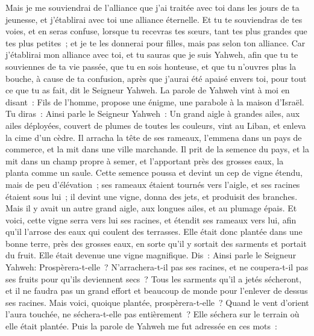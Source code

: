 \begin{multicols}{2}
Mais je me souviendrai de l'alliance que j'ai traitée avec toi dans les jours de ta jeunesse, et j'établirai avec toi une alliance éternelle.
Et tu te souviendras de tes voies, et en seras confuse, lorsque tu recevras tes sœurs, tant tes plus grandes que tes plus petites~; et je te les donnerai pour filles, mais pas selon ton alliance.
Car j'établirai mon alliance avec toi, et tu sauras que je suis Yahweh,
afin que tu te souviennes de ta vie passée, que tu en sois honteuse, et que tu n'ouvres plus la bouche, à cause de ta confusion, après que j'aurai été apaisé envers toi, pour tout ce que tu as fait, dit le Seigneur Yahweh.
\VerseOne{}La parole de Yahweh vint à moi en disant~:
Fils de l'homme, propose une énigme, une parabole à la maison d'Israël.
Tu diras~: Ainsi parle le Seigneur Yahweh~: Un grand aigle à grandes ailes, aux ailes déployées, couvert de plumes de toutes les couleurs, vint au Liban, et enleva la cime d'un cèdre.
Il arracha la tête de ses rameaux, l'emmena dans un pays de commerce, et la mit dans une ville marchande.
Il prit de la semence du pays, et la mit dans un champ propre à semer, et l'apportant près des grosses eaux, la planta comme un saule.
Cette semence poussa et devint un cep de vigne étendu, mais de peu d'élévation~; ses rameaux étaient tournés vers l'aigle, et ses racines étaient sous lui~; il devint une vigne, donna des jets, et produisit des branches.
Mais il y avait un autre grand aigle, aux longues ailes, et au plumage épais. Et voici, cette vigne serra vers lui ses racines, et étendit ses rameaux vers lui, afin qu'il l'arrose des eaux qui coulent des terrasses.
Elle était donc plantée dans une bonne terre, près des grosses eaux, en sorte qu'il y sortait des sarments et portait du fruit. Elle était devenue une vigne magnifique.
Dis~: Ainsi parle le Seigneur Yahweh: Prospèrera-t-elle~? N'arrachera-t-il pas ses racines, et ne coupera-t-il pas ses fruits pour qu'ils deviennent secs~? Tous les sarments qu'il a jetés sécheront, et il ne faudra pas un grand effort et beaucoup de monde pour l'enlever de dessus ses racines.
Mais voici, quoique plantée, prospèrera-t-elle~? Quand le vent d'orient l'aura touchée, ne séchera-t-elle pas entièrement~? Elle séchera sur le terrain où elle était plantée.
Puis la parole de Yahweh me fut adressée en ces mots~:

\end{multicols}
